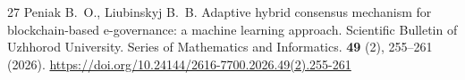 \begin{thebibliography}{27}
Peniak B.~O., Liubinskyj B.~B. Adaptive hybrid consensus mechanism for
blockchain-based e-governance: a machine learning approach. Scientific Bulletin
of Uzhhorod University. Series of Mathematics and Informatics. \textbf{49} (2),
255--261 (2026).
\url{https://doi.org/10.24144/2616-7700.2026.49(2).255-261}

\end{thebibliography}
